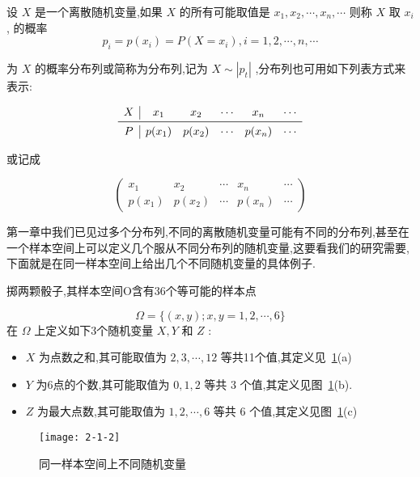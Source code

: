 \begin{definition}{}{}
	设 $ X $ 是一个离散随机变量,如果 $ X $ 的所有可能取值是 $ x_1,x_{2}, \cdots, x_{n}, \cdots $ 则称 $ X $ 取 $ x_i $ , 的概率
	\begin{equation} 
	p_{i}=p\left(x_{i}\right)=P\left(X=x_{i}\right), i=1,2, \cdots, n, \cdots \label{eq:2.1.2}
	\end{equation}
	
	为 $ X $ 的概率分布列或简称为分布列,记为 $ X \sim\left|p_{t}\right| $ ,分布列也可用如下列表方式来表示:
	
	\[
	\begin{array}{c|ccccc}
	X	&    x_{1}     &    x_{2}     &    \cdots     &     x_{n}    &   \cdots \\\midrule
	P	&    p(x_1)     &    p(x_2)     &    \cdots     &    p(x_n)     &   \cdots \\
	\end{array}
	\]
	
	
	或记成
	
	\[ 
	\left( \begin{array}{ccccc}{x_{1}} & {x_{2}} & {\cdots} & {x_{n}} & {\cdots} \\ {p\left(x_{1}\right)} & {p\left(x_{2}\right)} & {\cdots} & {p\left(x_{n}\right)} & {\cdots}\end{array}\right)
	\]
	
\end{definition}


第一章中我们已见过多个分布列,不同的离散随机变量可能有不同的分布列,甚至在一个样本空间上可以定义几个服从不同分布列的随机变量,这要看我们的研究需要,下面就是在同一样本空间上给出几个不同随机变量的具体例子.
\begin{example}
	掷两颗骰子,其样本空间O含有36个等可能的样本点
	
	\[ 
	\Omega=\{(x, y) ; x, y=1,2, \cdots, 6\}
	\]
	在 $ \Omega $ 上定义如下3个随机变量 $ X,Y $ 和 $ Z $ :
	\begin{itemize}
		\item $ X $ 为点数之和,其可能取值为 $ 2,3, \cdots, 12 $ 等共11个值,其定义见~\ref{fig:2-1-2}(a)
		\item $ Y $ 为6点的个数,其可能取值为 $ 0,1,2 $ 等共 $ 3 $ 个值,其定义见图~\ref{fig:2-1-2}(b).
		\item $ Z $ 为最大点数,其可能取值为 $ 1,2, \cdots, 6 $ 等共 $ 6 $ 个值,其定义见图~\ref{fig:2-1-2}(c)
	\end{itemize}
\end{example}


\begin{figure}
	\centering
	\texttt{[image: 2-1-2]}
	\caption{同一样本空间上不同随机变量}
	\label{fig:2-1-2}
\end{figure}

